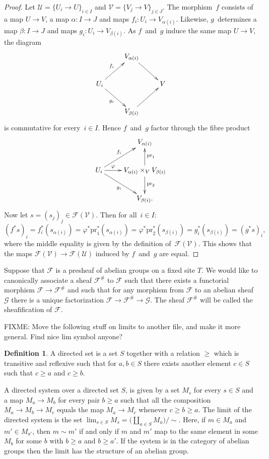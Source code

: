 \documentclass{amsart}
\theoremstyle{definition}
\newtheorem{definition}[theorem]{Definition}
\theoremstyle{remark}
\numberwithin{equation}{subsection}
\begin{document}
\begin{proof}
Let $\mathcal{U}=\{U_i \to U\}_{i\in I}$ and 
$\mathcal{V}=\{V_j \to V\}_{j\in J}$.
The morphism~$f$ consists of a map $U\to V$, a map $\alpha\colon I\to J$ and
maps $f_i\colon U_i\to V_{\alpha(i)}$.
Likewise, $g$~determines a map $\beta\colon I\to J$ and maps
$g_i\colon U_i\to V_{\beta(i)}$.
As $f$~and~$g$ induce the same map $U\to V$, the diagram
$$\xymatrix{&V_{\alpha(i)}\ar[dr]\\
  U_i\ar[ur]^{f_i}\ar[dr]_{g_i}&&V\\
  &V_{\beta(i)}\ar[ur]}$$
is commutative for every~$i\in I$. Hence $f$~and~$g$ factor through 
the fibre product
$$\xymatrix{&V_{\alpha(i)}\\
  U_i\ar[r]^-\varphi\ar[ur]^{f_i}\ar[dr]_{g_i}&
  V_{\alpha(i)}\times_VV_{\beta(i)}\ar[u]_{\text{pr}_1}\ar[d]^{\text{pr}_2}\\
  &V_{\beta(i)}.}$$
Now let $s=(s_j)_j\in\mathcal{F}(\mathcal{V})$.
Then for all~$i\in I$:
 $$(f^*s)_i=f_i^*(s_{\alpha(i)})=\varphi^*\text{pr}_1^*(s_{\alpha(i)})
   =\varphi^*\text{pr}_2^*(s_{\beta(i)})=g_i^*(s_{\beta(i)})=(g^*s)_i,$$
where the middle equality is given by the definition 
of~$\mathcal{F}(\mathcal{V})$.
This shows that the maps $\mathcal{F}(\mathcal{V})\to\mathcal{F}(\mathcal{U})$
induced by $f$~and~$g$ are equal.
\end{proof}

\smallskip\noindent
Suppose that $\mathcal{F}$ is a presheaf of abelian groups on a
fixed site $T$.  We would like to canonically associate a sheaf
$\mathcal{F}^\#$ to $\mathcal{F}$ such that there exists a
functorial morphism $\mathcal{F} \rightarrow \mathcal{F}^\#$ and such that for
any morphism from $\mathcal{F}$ to an abelian sheaf $\mathcal{G}$
there is a unique factorization $\mathcal{F} \rightarrow
\mathcal{F}^\# \rightarrow \mathcal{G}$. The sheaf $\mathcal{F}^\#$ will be
called the sheafification of $\mathcal{F}$.

\smallskip\noindent
FIXME: Move the following stuff on limits to another file, and make it
more general. Find nice lim symbol anyone?

\begin{definition}
A directed set is a set $S$ together with a relation $\geq$ which is
transitive and reflexive such that for $a, b \in S$ there exists another
element $c \in S$ such that $c \geq a$ and $c \geq b$.
\end{definition}

\noindent
A directed system over a directed set $S$, is given by a set $M_s$ for
every $s\in S$ and a map $M_a \to M_b$ for every pair $b\geq a$ such
that all the composition $M_a \to M_b \to M_c$ equals the map
$M_a \to M_c$ whenever $c \geq b \geq a$. The limit of the directed system
is the set $\lim_{s\in S} M_s = \big(\coprod_{a\in S} M_a\big)/\sim$. Here,
if $m\in M_a$ and $m'\in M_{a'}$, then $m \sim m'$ if and only if $m$ and $m'$
map to the same element in some $M_b$ for some $b$ with $b\geq a$ and
$b \geq a'$. If the system is in the category of abelian groups then the
limit has the structure of an abelian group.
\end{document}
